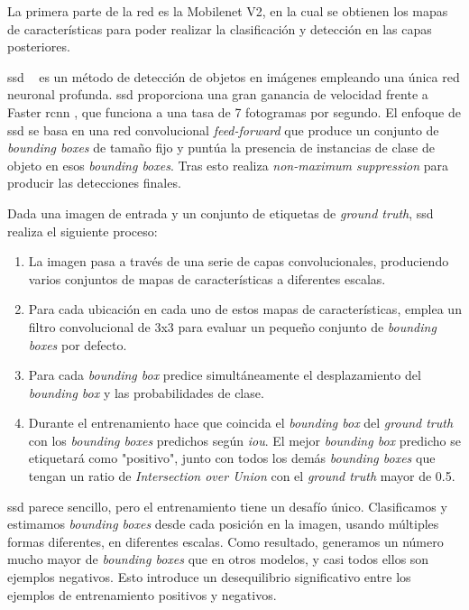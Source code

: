 La primera parte de la red es la Mobilenet V2, en la cual se obtienen los mapas de características para poder realizar la clasificación y detección en las capas posteriores. 

\acrshort{ssd} ~\cite{ssd_article} es un método de detección de objetos en imágenes empleando una única red neuronal profunda. \acrshort{ssd} proporciona una gran ganancia de velocidad frente a Faster \acrshort{rcnn} \cite{rcnn_faster}, que funciona a una tasa de 7 fotogramas por segundo. El enfoque de \acrshort{ssd} se basa en una red convolucional \textit{feed-forward} que produce un conjunto de \textit{bounding boxes} de tamaño fijo y puntúa la presencia de instancias de clase de objeto en esos \textit{bounding boxes}. Tras esto realiza \textit{non-maximum suppression} para producir las detecciones finales. 

Dada una imagen de entrada y un conjunto de etiquetas de \textit{ground truth}, \acrshort{ssd} realiza el siguiente proceso:
\begin{enumerate}
\item La imagen pasa a través de una serie de capas convolucionales, produciendo varios conjuntos de mapas de características a diferentes escalas.
\item Para cada ubicación en cada uno de estos mapas de características, emplea un filtro convolucional de 3x3 para evaluar un pequeño conjunto de \textit{bounding boxes} por defecto.
\item Para cada \textit{bounding box} predice simultáneamente el desplazamiento del \textit{bounding box} y las probabilidades de clase.
\item Durante el entrenamiento hace que coincida el \textit{bounding box} del \textit{ground truth} con los \textit{bounding boxes} predichos según \textit{\acrfull{iou}}. El mejor \textit{bounding box} predicho se etiquetará como "positivo", junto con todos los demás \textit{bounding boxes} que tengan un ratio de \textit{Intersection over Union} con el \textit{ground truth} mayor de 0.5.
\end{enumerate}

\acrshort{ssd} parece sencillo, pero el entrenamiento tiene un desafío único. Clasificamos y estimamos \textit{bounding boxes} desde cada posición en la imagen, usando múltiples formas diferentes, en diferentes escalas. Como resultado, generamos un número mucho mayor de \textit{bounding boxes} que en otros modelos, y casi todos ellos son ejemplos negativos. Esto introduce un desequilibrio significativo entre los ejemplos de entrenamiento positivos y negativos.

